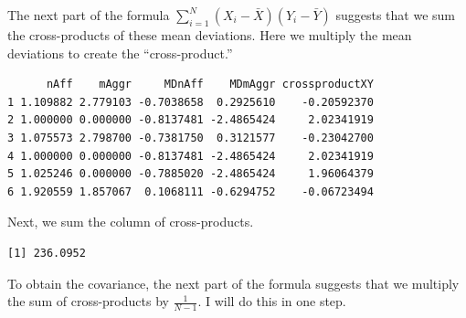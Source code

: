\documentclass[
  11pt,
]{book}
\newenvironment{Shaded}{\begin{snugshade}}{\end{snugshade}}
\newcommand{\CommentTok}[1]{\textcolor[rgb]{0.37,0.37,0.37}{\textit{#1}}}
\newcommand{\DecValTok}[1]{\textcolor[rgb]{0.06,0.06,0.06}{#1}}
\newcommand{\FunctionTok}[1]{\textcolor[rgb]{0.27,0.27,0.27}{\textbf{#1}}}
\newcommand{\NormalTok}[1]{#1}
\newcommand{\OtherTok}[1]{\textcolor[rgb]{0.37,0.37,0.37}{#1}}
\newcommand{\SpecialCharTok}[1]{\textcolor[rgb]{0.43,0.43,0.43}{\textbf{#1}}}
\begin{document}
The next part of the formula \(\sum_{i=1}^N \left( X_i - \bar{X} \right) \left( Y_i - \bar{Y} \right)\) suggests that we sum the cross-products of these mean deviations. Here we multiply the mean deviations to create the ``cross-product.''

\begin{Shaded}
\end{Shaded}

\begin{verbatim}
      nAff    mAggr     MDnAff    MDmAggr crossproductXY
1 1.109882 2.779103 -0.7038658  0.2925610    -0.20592370
2 1.000000 0.000000 -0.8137481 -2.4865424     2.02341919
3 1.075573 2.798700 -0.7381750  0.3121577    -0.23042700
4 1.000000 0.000000 -0.8137481 -2.4865424     2.02341919
5 1.025246 0.000000 -0.7885020 -2.4865424     1.96064379
6 1.920559 1.857067  0.1068111 -0.6294752    -0.06723494
\end{verbatim}

Next, we sum the column of cross-products.

\begin{Shaded}
\end{Shaded}

\begin{verbatim}
[1] 236.0952
\end{verbatim}

To obtain the covariance, the next part of the formula suggests that we multiply the sum of cross-products by \(\frac{1}{N-1}\). I will do this in one step.

\begin{Shaded}
\end{Shaded}
\end{document}
